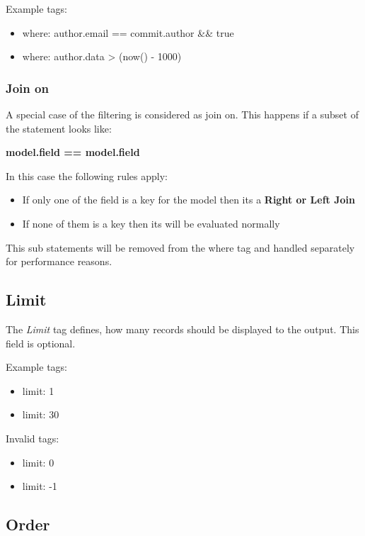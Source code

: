 Example tags:
\begin{itemize}
	\item where: author.email == commit.author \&\& true
	\item where: author.data > (now() - 1000)
\end{itemize}

\subsubsection{Join on}

A special case of the filtering is considered as join on. 
This happens if a subset of the statement looks like:\newline

\textbf{{model}.{field} == {model}.{field}}\newline

In this case the following rules apply:

\begin{itemize}
	\item If only one of the field is a key for the model then its a \textbf{Right or Left Join}
	\item If none of them is a key then its will be evaluated normally
\end{itemize}

This sub statements will be removed from the where tag and handled separately for performance reasons.

\subsection{Limit}

The \textit{Limit} tag defines, how many records should be displayed to the output.
This field is optional.

Example tags:
\begin{itemize}
	\item limit: 1
	\item limit: 30
\end{itemize}

Invalid tags:
\begin{itemize}
	\item limit: 0
	\item limit: -1
\end{itemize}

\subsection{Order}

